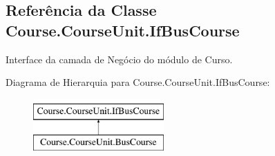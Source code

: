 \hypertarget{classCourse_1_1CourseUnit_1_1IfBusCourse}{\subsection{Referência da Classe Course.\-Course\-Unit.\-If\-Bus\-Course}
\label{classCourse_1_1CourseUnit_1_1IfBusCourse}
}


Interface da camada de Negócio do módulo de Curso.  


Diagrama de Hierarquia para Course.\-Course\-Unit.\-If\-Bus\-Course\-:\begin{figure}[H]
\begin{center}
\leavevmode
\includegraphics[height=2.000000cm]{d0/d28/classCourse_1_1CourseUnit_1_1IfBusCourse}
\end{center}
\end{figure}
